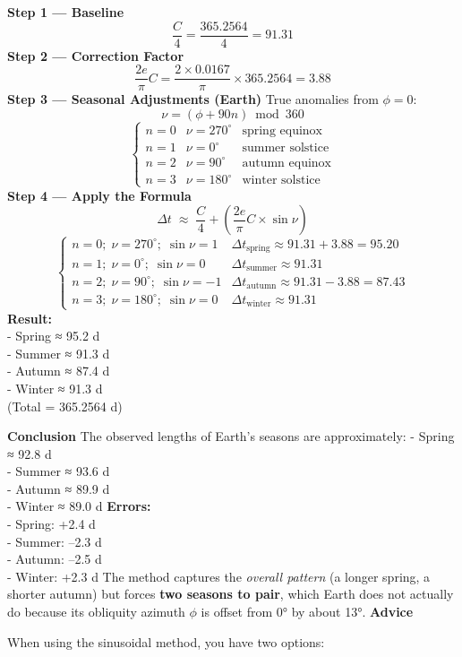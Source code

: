 \documentclass[
  letterpaper,
]{book}
\begin{document}
\textbf{Step 1 --- Baseline} \[
\frac{C}{4} = \frac{365.2564}{4} = 91.31
\] \textbf{Step 2 --- Correction Factor} \[
\frac{2e}{\pi} C = \frac{2 \times 0.0167}{\pi} \times 365.2564 = 3.88
\] \textbf{Step 3 --- Seasonal Adjustments (Earth)} True anomalies from
\(\phi = 0\): \[
\nu = (\phi + 90n) \bmod 360
\] \[
\begin{cases}
n = 0 & \nu = 270^\circ & \text{spring equinox} \\
n = 1 & \nu = 0^\circ & \text{summer solstice} \\
n = 2 & \nu = 90^\circ   & \text{autumn equinox} \\
n = 3 & \nu = 180^\circ  & \text{winter solstice}
\end{cases}
\] \textbf{Step 4 --- Apply the Formula} \[
\Delta t \;\approx\; \frac{C}{4} + \left(\frac{2e}{\pi} C \times \sin\nu\right)
\] \[
\begin{cases}
n=0;\;\nu=270^\circ;\;\sin\nu=1 & \Delta t_\text{spring} \approx 91.31 + 3.88 = 95.20 \\
n=1;\;\nu=0^\circ;\;\sin\nu=0 & \Delta t_\text{summer} \approx 91.31 \\
n=2;\;\nu=90^\circ;\;\sin\nu=-1 & \Delta t_\text{autumn} \approx 91.31 - 3.88 = 87.43 \\
n=3;\;\nu=180^\circ;\;\sin\nu=0 & \Delta t_\text{winter} \approx 91.31
\end{cases}
\] \textbf{Result:}\\
- Spring ≈ 95.2 d\\
- Summer ≈ 91.3 d\\
- Autumn ≈ 87.4 d\\
- Winter ≈ 91.3 d\\
(Total = 365.2564 d)

\textbf{Conclusion} The observed lengths of Earth's seasons are
approximately: - Spring ≈ 92.8 d\\
- Summer ≈ 93.6 d\\
- Autumn ≈ 89.9 d\\
- Winter ≈ 89.0 d \textbf{Errors:}\\
- Spring: +2.4 d\\
- Summer: --2.3 d\\
- Autumn: --2.5 d\\
- Winter: +2.3 d The method captures the \emph{overall pattern} (a
longer spring, a shorter autumn) but forces \textbf{two seasons to
pair}, which Earth does not actually do because its obliquity azimuth
\(\phi\) is offset from 0° by about 13°. \textbf{Advice}

When using the sinusoidal method, you have two options:
\end{document}
